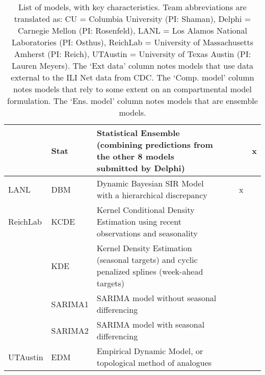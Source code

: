 \begin{table}
\begin{tabular}{p{1.69cm} l p{7.5cm}  p{1.1cm}  p{1.1cm} p{1.1cm}}
~        & Stat               & Statistical Ensemble (combining predictions from the other 8 models submitted by Delphi) & ~             & ~  & x                 \\
\hline
LANL     & DBM                & Dynamic Bayesian SIR Model with a hierarchical discrepancy & ~             & x      &              \\ 
\hline
ReichLab & KCDE               & Kernel Conditional Density Estimation using recent observations and seasonality  & ~             & ~            &        \\ 
~        & KDE                & Kernel Density Estimation (seasonal targets) and cyclic penalized splines (week-ahead targets)  & ~             & ~     &               \\ 
~        & SARIMA1            & SARIMA model without seasonal differencing & ~             & ~      &              \\ 
~        & SARIMA2            & SARIMA model with seasonal differencing & ~             & ~           &         \\ 
\hline
UTAustin & EDM                & Empirical Dynamic Model, or topological method of analogues & ~             & ~         &           \\ 
\end{tabular}
\caption{List of models, with key characteristics. Team abbreviations are translated as: CU = Columbia University (PI: Shaman), Delphi = Carnegie Mellon (PI: Rosenfeld), LANL = Los Alamos National Laboratories (PI: Osthus), ReichLab = University of Massachusetts Amherst (PI: Reich), UTAustin = University of Texas Austin (PI: Lauren Meyers).  The `Ext data' column notes models that use data external to the ILI Net data from CDC. The `Comp. model' column notes models that rely to some extent on an compartmental model formulation. The `Ens. model' column notes models that are ensemble models.}
\label{tab:model-list}
\end{table}